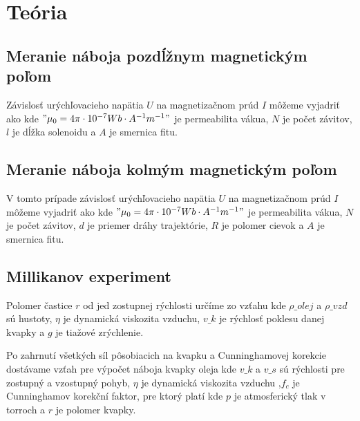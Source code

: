 \section{Teória}
\subsection{Meranie náboja pozdĺžnym magnetickým poľom}
Závislosť urýchľovacieho napätia $U$ na magnetizačnom prúd $I$ môžeme vyjadriť ako
kde $"\mu_0 = 4\pi\cdot10^{-7} Wb\cdot A^{-1} m^{-1}"$ je permeabilita vákua, $N$ je počet závitov, $l$ je dĺžka solenoidu a $A$ je smernica fitu.

\subsection{Meranie náboja kolmým magnetickým poľom}

V tomto prípade závislosť urýchľovacieho napätia $U$ na magnetizačnom prúd $I$ môžeme vyjadriť ako
kde $"\mu_0 = 4\pi\cdot10^{-7} Wb\cdot A^{-1} m^{-1}"$ je permeabilita vákua, $N$ je počet závitov, $d$ je priemer dráhy trajektórie, $R$ je polomer cievok a $A$ je smernica fitu.

\subsection{Millikanov experiment}
Polomer častice $r$ od jed zostupnej rýchlosti určíme zo vzťahu 
kde $\rho\_{olej}$ a $\rho\_{vzd}$ sú hustoty, $\eta$ je dynamická viskozita vzduchu, $v\_k$ je rýchlosť poklesu danej kvapky a $g$ je tiažové zrýchlenie.

Po zahrnutí všetkých síl pôsobiacich na kvapku a Cunninghamovej korekcie dostávame vzťah pre výpočet náboja kvapky oleja
kde $v\_k$ a $v\_s$ sú rýchlosti pre zostupný a vzostupný pohyb, $\eta$ je dynamická viskozita vzduchu ,$f_c$ je Cunninghamov korekční faktor, pre ktorý platí
kde $p$ je atmosferický tlak v torroch a $r$ je polomer kvapky.




